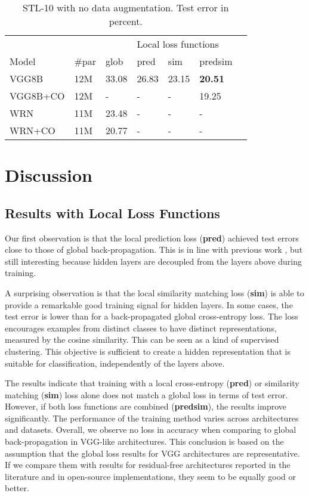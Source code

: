\documentclass{article}
\begin{document}
\begin{table}[h]
  \caption{STL-10 with no data augmentation. Test error in percent.}
  \label{table:stl10}
  \centering
  \begin{tabular}{lllllll}
    \toprule
    &&& \multicolumn{3}{|l}{Local loss functions} \\
    Model   & \#par & glob & \multicolumn{1}{|l}{pred} & sim & \multicolumn{1}{l}{predsim}  \\
    \midrule
    VGG8B & 12M &  33.08 & \multicolumn{1}{|l}{26.83} & 23.15  & \textbf{20.51} \\
    VGG8B+CO & 12M &  - & \multicolumn{1}{|l}{-} & -  & 19.25 \\
    \midrule
    WRN & 11M & 23.48  & \multicolumn{1}{|l}{-} & - & - \\
    WRN+CO & 11M & 20.77  & \multicolumn{1}{|l}{-} & - & - \\
    \bottomrule
  \end{tabular}
\end{table}

\section{Discussion}

\subsection{Results with Local Loss Functions}

Our first observation is that the local prediction loss (\textbf{pred}) achieved test errors close to those of global back-propagation. This is in line with previous work \cite{Mostafa17,BelilovskyEO18}, but still interesting because hidden layers are decoupled from the layers above during training.

A surprising observation is that the local similarity matching loss (\textbf{sim}) is able to provide a remarkable good training signal for hidden layers. In some cases, the test error is lower than for a back-propagated global cross-entropy loss. The loss encourages examples from distinct classes to have distinct representations, measured by the cosine similarity. This can be seen as a kind of supervised clustering. This objective is sufficient to create a hidden representation that is suitable for classification, independently of the layers above.

The results indicate that training with a local cross-entropy (\textbf{pred}) or similarity matching (\textbf{sim}) loss alone does not match a global loss in terms of test error. However, if both loss functions are combined (\textbf{predsim}), the results improve significantly. The performance of the training method varies across architectures and datasets. Overall, we observe no loss in accuracy when comparing to global back-propagation in VGG-like architectures. This conclusion is based on the assumption that the global loss results for VGG architectures are representative. If we compare them with results for residual-free architectures reported in the literature and in open-source implementations, they seem to be equally good or better.
\end{document}
